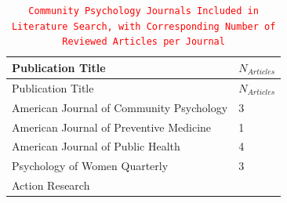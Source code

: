\documentclass[]{tufte-handout}
\newcommand{\edit}[1]{
    \textcolor{red}{
        \texttt{#1}
    }
}
\begin{document}
\begin{longtable}[]{@{}ll@{}}
\caption{\edit{Community Psychology Journals Included in Literature Search, with Corresponding Number of Reviewed Articles per Journal}}\tabularnewline
\toprule
\begin{minipage}[b]{0.68\columnwidth}\raggedright\strut
Publication Title\strut
\end{minipage} & \begin{minipage}[b]{0.21\columnwidth}\raggedright\strut
\(N_{Articles}\)\strut
\end{minipage}\tabularnewline
\midrule
\endfirsthead
\toprule
\begin{minipage}[b]{0.68\columnwidth}\raggedright\strut
Publication Title\strut
\end{minipage} & \begin{minipage}[b]{0.21\columnwidth}\raggedright\strut
\(N_{Articles}\)\strut
\end{minipage}\tabularnewline
\midrule
\endhead
\begin{minipage}[t]{0.68\columnwidth}\raggedright\strut
American Journal of Community Psychology\strut
\end{minipage} & \begin{minipage}[t]{0.21\columnwidth}\raggedright\strut
3\strut
\end{minipage}\tabularnewline
\begin{minipage}[t]{0.68\columnwidth}\raggedright\strut
American Journal of Preventive Medicine\strut
\end{minipage} & \begin{minipage}[t]{0.21\columnwidth}\raggedright\strut
1\strut
\end{minipage}\tabularnewline
\begin{minipage}[t]{0.68\columnwidth}\raggedright\strut
American Journal of Public Health\strut
\end{minipage} & \begin{minipage}[t]{0.21\columnwidth}\raggedright\strut
4\strut
\end{minipage}\tabularnewline
\begin{minipage}[t]{0.68\columnwidth}\raggedright\strut
Psychology of Women Quarterly\strut
\end{minipage} & \begin{minipage}[t]{0.21\columnwidth}\raggedright\strut
3\strut
\end{minipage}\tabularnewline
\begin{minipage}[t]{0.68\columnwidth}\raggedright\strut
Action Research\strut

\end{minipage}
\end{longtable}
\end{document}
